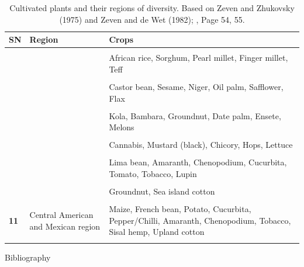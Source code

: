 \documentclass[
  ignorenonframetext,
  aspectratio=169]{beamer}
\newif\ifbibliography
\begin{document}
\begin{frame}{}
\protect\hypertarget{section-14}{}
\begin{table}

\caption{\label{tab:diversity-region3}Cultivated plants and their regions of diversity. Based on Zeven and Zhukovsky (1975) and Zeven and de Wet (1982); \cite{hayward2012plant}, Page 54, 55.}
\centering
\fontsize{6}{8}\selectfont
\begin{tabular}[t]{>{\raggedright\arraybackslash}p{3em}>{\raggedright\arraybackslash}p{14em}>{\raggedright\arraybackslash}p{32em}}
\toprule
SN & Region & Crops\\
\midrule
\textbf{\cellcolor{gray!6}{8}} & \cellcolor{gray!6}{African region} & \cellcolor{gray!6}{Wheat (Durum, Emmer, Poulard, Bread)}\\
\textbf{} &  & African rice, Sorghum, Pearl millet, Finger millet, Teff\\
\textbf{\cellcolor{gray!6}{}} & \cellcolor{gray!6}{} & \cellcolor{gray!6}{Cowpea, Bottle gourd, Okra, Yams, Cucumber}\\
\textbf{} &  & Castor bean, Sesame, Niger, Oil palm, Safflower, Flax\\
\textbf{\cellcolor{gray!6}{}} & \cellcolor{gray!6}{} & \cellcolor{gray!6}{Cotton, Kenaf, Coffee}\\
\addlinespace
\textbf{} &  & Kola, Bambara, Groundnut, Date palm, Ensete, Melons\\
\textbf{\cellcolor{gray!6}{9}} & \cellcolor{gray!6}{European-siberian region} & \cellcolor{gray!6}{Peach, Pear, Plum, Apricot, Apple, Almond, Walnut, Pistachio, Cherry}\\
\textbf{} &  & Cannabis, Mustard (black), Chicory, Hops, Lettuce\\
\textbf{\cellcolor{gray!6}{10}} & \cellcolor{gray!6}{South American region} & \cellcolor{gray!6}{Potato, Sweet potato, Xanthosoma}\\
\textbf{} &  & Lima bean, Amaranth, Chenopodium, Cucurbita, Tomato, Tobacco, Lupin\\
\addlinespace
\textbf{\cellcolor{gray!6}{}} & \cellcolor{gray!6}{} & \cellcolor{gray!6}{Papaya, Pineapple}\\
\textbf{} &  & Groundnut, Sea island cotton\\
\textbf{\cellcolor{gray!6}{}} & \cellcolor{gray!6}{} & \cellcolor{gray!6}{Cassava, Cacao, Rubber tree, Passion fruit}\\
\textbf{11} & Central American and Mexican region & Maize, French bean, Potato, Cucurbita, Pepper/Chilli, Amaranth, Chenopodium, Tobacco, Sisal hemp, Upland cotton\\
\textbf{\cellcolor{gray!6}{12}} & \cellcolor{gray!6}{North American region} & \cellcolor{gray!6}{Jeruselum artichoke, Sunflower, Plum, Raspberry, Strawberry}\\
\bottomrule
\end{tabular}
\end{table}
\end{frame}

\renewcommand\refname{Bibliography}
\begin{frame}[allowframebreaks]{Bibliography}
  \bibliographytrue
  
\end{frame}
\end{document}
